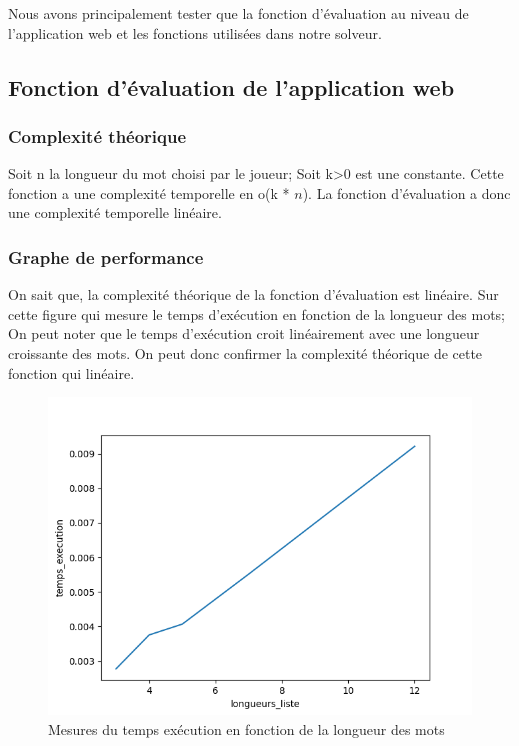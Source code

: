 Nous avons principalement tester que la fonction d'évaluation au niveau de l'application web et les fonctions utilisées dans notre solveur.

\subsection{Fonction d'évaluation de l'application web}

\subsubsection{Complexité théorique}

Soit n la longueur du mot choisi par le joueur; Soit k>0 est une constante.
Cette fonction a une complexité temporelle en o(k * $n$). La fonction d'évaluation a donc une complexité temporelle linéaire. 

\subsubsection{Graphe de performance}

On sait que, la complexité théorique de la fonction d'évaluation est linéaire. Sur cette figure qui mesure le temps d'exécution en fonction de la longueur des mots; On peut noter que le temps d'exécution croit linéairement avec une longueur croissante des mots. 
On peut donc confirmer la complexité théorique de cette fonction qui linéaire.

\begin{figure}[h!]
    \centering
    \includegraphics[scale=0.9]{figures/evaluation_test.png}
    \caption{Mesures du temps exécution en fonction de la longueur des mots}
    \label{fig:my_label}
\end{figure}
\newpage
